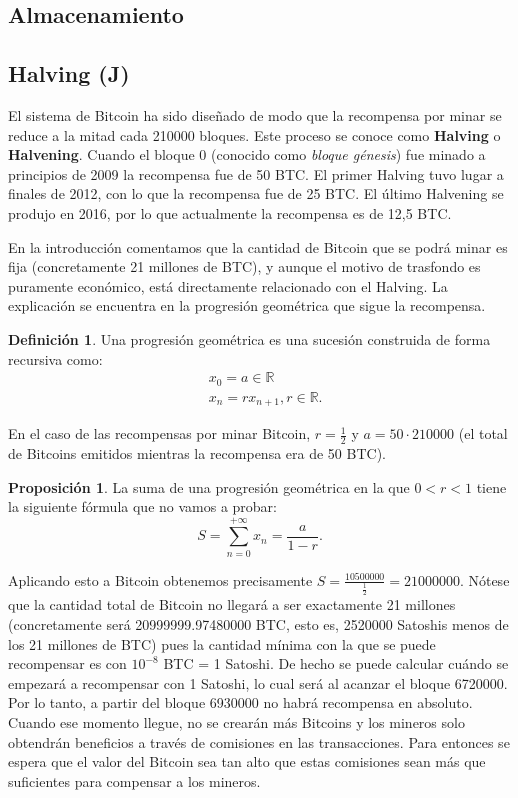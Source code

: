 \documentclass[twoside]{article}
\theoremstyle{definition}
\newtheorem{defi}[teorema]{Definición}
\newtheorem{prop}[teorema]{Proposición}
\newcommand{\R}{\mathbb{R}}
\begin{document}
\subsection{Almacenamiento}
\subsection{Halving (J)}
El sistema de Bitcoin ha sido diseñado de modo que la recompensa por minar se reduce a la mitad cada 210000 bloques. Este proceso se conoce como \textbf{Halving} o \textbf{Halvening}. Cuando el bloque 0 (conocido como \emph{bloque génesis}) fue minado a principios de 2009 la recompensa fue de 50 BTC. El primer Halving tuvo lugar a finales de 2012, con lo que la recompensa fue de 25 BTC. El último Halvening se produjo en 2016, por lo que actualmente la recompensa es de 12,5 BTC.  

En la introducción comentamos que la cantidad de Bitcoin que se podrá minar es fija (concretamente 21 millones de BTC), y aunque el motivo de trasfondo es puramente económico, está directamente relacionado con el Halving. La explicación se encuentra en la progresión geométrica que sigue la recompensa. 

\begin{defi}
Una progresión geométrica es una sucesión construida de forma recursiva como:
\begin{align*}
&x_0=a\in\R\\
&x_n=rx_{n+1}, r\in\R .
\end{align*}
\end{defi}

En el caso de las recompensas por minar Bitcoin, $r=\frac{1}{2}$ y $a=50\cdot 210000$ (el total de Bitcoins emitidos mientras la recompensa era de 50 BTC). \begin{prop}
La suma de una progresión geométrica en la que $0<r<1$ tiene la siguiente fórmula que no vamos a probar:
\[
S=\sum_{n=0}^{+\infty}x_n=\frac{a}{1-r}.
\]
\end{prop}

Aplicando esto a Bitcoin obtenemos precisamente $S=\frac{10500000}{\frac{1}{2}} = 21000000$. Nótese que la cantidad total de Bitcoin no llegará a ser exactamente 21 millones (concretamente será 20999999.97480000 BTC, esto es, 2520000 Satoshis menos de los 21 millones de BTC) pues la cantidad mínima con la que se puede recompensar es con $10^{-8}$ BTC = 1 Satoshi. De hecho se puede calcular cuándo se empezará a recompensar con 1 Satoshi, lo cual será al acanzar el bloque 6720000. Por lo tanto, a partir del bloque 6930000 no habrá recompensa en absoluto. Cuando ese momento llegue, no se crearán más Bitcoins y los mineros solo obtendrán beneficios a través de comisiones en las transacciones. Para entonces se espera que el valor del Bitcoin sea tan alto que estas comisiones sean más que suficientes para compensar a los mineros.\\
\end{document}
